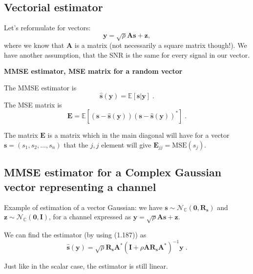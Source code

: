 \documentclass[a4paper, 12pt]{book}
\begin{document}
\subsection{Vectorial estimator}

Let's reformulate for vectors:
\begin{equation}
\bm{y} = \sqrt{\rho}\bm{A}\bm{s} + \bm{z}, \tag{1.186}
\end{equation}
where we know that $\bm{A}$ is a matrix (not necessarily a square matrix though!).
We have another assumption, that the SNR is the same for every signal in our vector.

\begin{tcolorbox}[colframe=cyan!80!blue, colback=white, boxrule=1pt, arc=2pt]
    \textcolor{cyan!80!blue}{\textbf{MMSE estimator, MSE matrix for a random vector}}

    The MMSE estimator is
    \begin{equation}
    \hat{\bm{s}}(\bm{y}) = \mathbb{E}[\bm{s}|\bm{y}] \;. \tag{1.187}
    \end{equation}
    The MSE matrix is
    \begin{equation}
    \bm{E} = \mathbb{E}[(\bm{s} - \hat{\bm{s}}(\bm{y}))(\bm{s} - \hat{\bm{s}}(\bm{y}))^*] \;. \tag{1.188}
    \end{equation}
\end{tcolorbox}

The matrix $\bm{E}$ is a matrix which in the main diagonal will have for a vector $\bm{s} = (s_1, s_2, \dots, s_n)$ that the $j,j$ element will give $\bm{E}_{jj} = \text{MSE}(s_j)$.

\subsection{MMSE estimator for a Complex Gaussian vector representing a channel}

Example of estimation of a vector Gaussian: we have $\bm{s} \sim \mathcal{N}_{\mathbb{C}}(\bm{0}, \bm{R}_{\bm{s}})$ and $\bm{z} \sim \mathcal{N}_{\mathbb{C}}(\bm{0}, \bm{I})$, for a channel expressed as $\bm{y} = \sqrt{\rho}\bm{A}\bm{s} + \bm{z}$.

We can find the estimator (by using (1.187)) as
\begin{equation}
\hat{\bm{s}}(\bm{y}) = \sqrt{\rho}\bm{R}_{\bm{s}}\bm{A}^*(\bm{I} + \rho\bm{A}\bm{R}_{\bm{s}}\bm{A}^*)^{-1}\bm{y} \;. \tag{1.189}
\end{equation}

\begin{tcolorbox}[sharp corners, boxrule=0pt, leftrule=2pt, colframe=green!60!black, colback=green!5, left=5pt, top=3pt, bottom=3pt]
    Just like in the scalar case, the estimator is still linear.
\end{tcolorbox}
\end{document}
